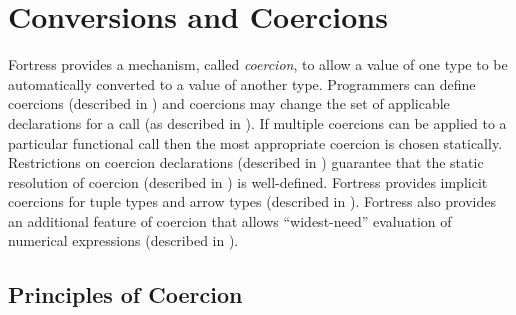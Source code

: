 %
%
%
%

\chapter{Conversions and Coercions}


Fortress provides a mechanism, called \emph{coercion}, to allow a
value of one type to be automatically converted to a value of another
type.  Programmers can define coercions (described in
) and coercions may change the set of
applicable declarations for a call (as described in
).  If multiple coercions can be
applied to a particular functional call then the most appropriate
coercion is chosen statically.  Restrictions on coercion declarations
(described in ) guarantee that the
static resolution of coercion (described in
) is well-defined.  Fortress provides
implicit coercions for tuple types and arrow types (described in
).  Fortress also provides an additional
feature of coercion that allows ``widest-need'' evaluation of
numerical expressions (described in ).

\section{Principles of Coercion}

